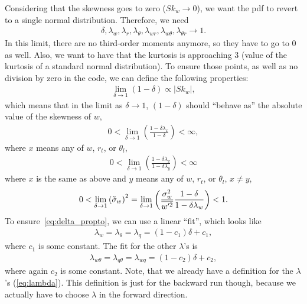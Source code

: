 \documentclass[10pt]{beamer}
\numberwithin{equation}{section}
\begin{document}
    \begin{frame}[allowframebreaks]

        Considering that the skewness goes to zero ($Sk_w \to 0$),
        we want the pdf to revert to a single normal distribution.
        Therefore, we need
        \begin{align}
            \delta, \lambda_w, \lambda_r, \lambda_\theta,
            \lambda_{w r}, \lambda_{w \theta}, \lambda_{\theta r}
            \to 1.
        \end{align}
        In this limit, there are no third-order moments anymore, so they have to go to 0 as well.
        Also, we want to have that the kurtosis is approaching 3 (value of the kurtosis of a standard normal distribution).
        To ensure those points, as well as no division by zero in the code, we can define the following properties:
        \begin{align}
            \label{eq:delta_propto}
            \lim_{\delta \to 1} (1-\delta) \propto |Sk_w|,
        \end{align}
        which means that in the limit as $\delta \to 1$,
        $(1-\delta)$ should \enquote{behave as} the absolute value of the skewness of $w$,
        \begin{align}
            0 < \lim_{\delta\to 1} \left(\frac{1-\delta\lambda_x}{1-\delta}\right) < \infty,
        \end{align}
        where $x$ means any of $w$, $r_t$, or $\theta_l$,
        \begin{align}
            0 < \lim_{\delta\to 1} \left(\frac{1-\delta\lambda_x}{1-\delta\lambda_y}\right) < \infty
        \end{align}
        where $x$ is the same as above and $y$ means any of $w$, $r_t$, or $\theta_l$, $x \neq y$,
        \begin{align}
            0 < \lim_{\delta \to 1} \left({\tilde{\sigma}_w}\right)^2
            = \lim_{\delta \to 1} \left(\frac{\sigma_w^2}{\overline{w'^2}} \frac{1-\delta}{1-\delta \lambda_w}\right) < 1.
        \end{align}
        To ensure~\eqref{eq:delta_propto}, we can use a linear \enquote{fit}, which looks like
        \begin{align}
            \label{eq:lambda_fit}
            \lambda_w = \lambda_\theta = \lambda_q
            = (1 - c_1) \delta + c_1,
        \end{align}
        where $c_1$ is some constant.
        The fit for the other $\lambda$'s is
        \begin{align}
            \label{eq:lambda_xy_fit}
            \lambda_{w\theta} = \lambda_{q\theta} = \lambda_{wq}
            = (1 - c_2) \delta + c_2,
        \end{align}
        where again $c_2$ is some constant.
        Note, that we already have a definition for the $\lambda$'s (\eqref{eq:lambda}).
        This definition is just for the backward run though,
        because we actually have to choose $\lambda$ in the forward direction.


\end{frame}
\end{document}
